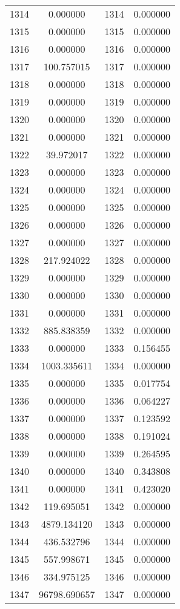 \documentclass[12pt]{article}
\begin{document}
\begin{longtable}{@{}cccc@{}}
1314 & 0.000000 & 1314 & 0.000000 \\
1315 & 0.000000 & 1315 & 0.000000 \\
1316 & 0.000000 & 1316 & 0.000000 \\
1317 & 100.757015 & 1317 & 0.000000 \\
1318 & 0.000000 & 1318 & 0.000000 \\
1319 & 0.000000 & 1319 & 0.000000 \\
1320 & 0.000000 & 1320 & 0.000000 \\
1321 & 0.000000 & 1321 & 0.000000 \\
1322 & 39.972017 & 1322 & 0.000000 \\
1323 & 0.000000 & 1323 & 0.000000 \\
1324 & 0.000000 & 1324 & 0.000000 \\
1325 & 0.000000 & 1325 & 0.000000 \\
1326 & 0.000000 & 1326 & 0.000000 \\
1327 & 0.000000 & 1327 & 0.000000 \\
1328 & 217.924022 & 1328 & 0.000000 \\
1329 & 0.000000 & 1329 & 0.000000 \\
1330 & 0.000000 & 1330 & 0.000000 \\
1331 & 0.000000 & 1331 & 0.000000 \\
1332 & 885.838359 & 1332 & 0.000000 \\
1333 & 0.000000 & 1333 & 0.156455 \\
1334 & 1003.335611 & 1334 & 0.000000 \\
1335 & 0.000000 & 1335 & 0.017754 \\
1336 & 0.000000 & 1336 & 0.064227 \\
1337 & 0.000000 & 1337 & 0.123592 \\
1338 & 0.000000 & 1338 & 0.191024 \\
1339 & 0.000000 & 1339 & 0.264595 \\
1340 & 0.000000 & 1340 & 0.343808 \\
1341 & 0.000000 & 1341 & 0.423020 \\
1342 & 119.695051 & 1342 & 0.000000 \\
1343 & 4879.134120 & 1343 & 0.000000 \\
1344 & 436.532796 & 1344 & 0.000000 \\
1345 & 557.998671 & 1345 & 0.000000 \\
1346 & 334.975125 & 1346 & 0.000000 \\
1347 & 96798.690657 & 1347 & 0.000000 \\

\end{longtable}
\end{document}
